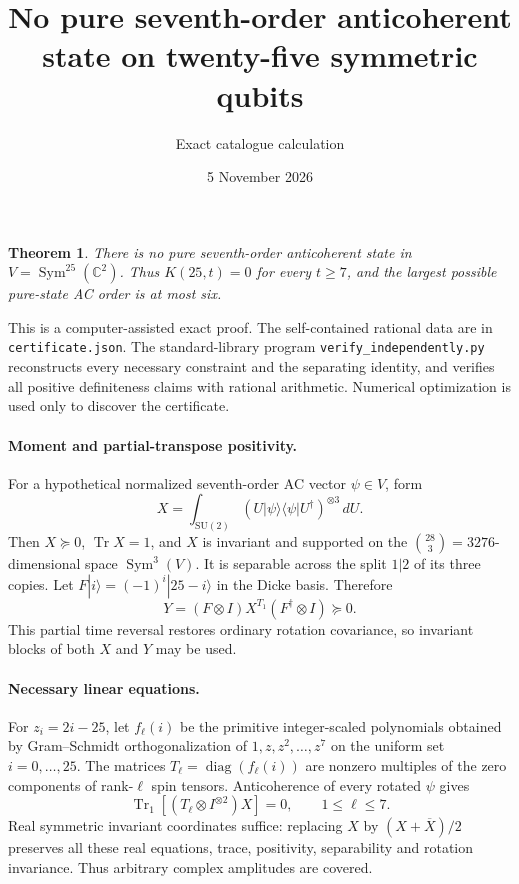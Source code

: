 \documentclass[11pt]{article}
\newtheorem{theorem}{Theorem}
\newcommand{\Tr}{\operatorname{Tr}}
\begin{document}
\title{No pure seventh-order anticoherent state on twenty-five symmetric qubits}
\author{Exact catalogue calculation}
\date{5 November 2026}
\maketitle
\begin{theorem}
There is no pure seventh-order anticoherent state in $V=\operatorname{Sym}^{25}(\mathbb C^2)$. Thus $K(25,t)=0$ for every $t\ge7$, and the largest possible pure-state AC order is at most six.
\end{theorem}
This is a computer-assisted exact proof. The self-contained rational data are in \texttt{certificate.json}. The standard-library program \texttt{verify\_independently.py} reconstructs every necessary constraint and the separating identity, and verifies all positive definiteness claims with rational arithmetic. Numerical optimization is used only to discover the certificate.

\paragraph{Moment and partial-transpose positivity.}
For a hypothetical normalized seventh-order AC vector $\psi\in V$, form
\[
X=\int_{\mathrm{SU}(2)}(U|\psi\rangle\langle\psi|U^\dagger)^{\otimes3}\,dU.
\]
Then $X\succeq0$, $\Tr X=1$, and $X$ is invariant and supported on the $\binom{28}{3}=3276$-dimensional space $\operatorname{Sym}^{3}(V)$. It is separable across the split $1|2$ of its three copies. Let $F|i\rangle=(-1)^i|25-i\rangle$ in the Dicke basis. Therefore
\[
Y=(F\otimes I)X^{T_1}(F^\dagger\otimes I)\succeq0.
\]
This partial time reversal restores ordinary rotation covariance, so invariant blocks of both $X$ and $Y$ may be used.

\paragraph{Necessary linear equations.}
For $z_i=2i-25$, let $f_\ell(i)$ be the primitive integer-scaled polynomials obtained by Gram--Schmidt orthogonalization of $1,z,z^2,\ldots,z^7$ on the uniform set $i=0,\ldots,25$. The matrices $T_\ell=\operatorname{diag}(f_\ell(i))$ are nonzero multiples of the zero components of rank-$\ell$ spin tensors. Anticoherence of every rotated $\psi$ gives
\[
\Tr_1[(T_\ell\otimes I^{\otimes2})X]=0,\qquad1\le\ell\le7.
\]
Real symmetric invariant coordinates suffice: replacing $X$ by $(X+\overline X)/2$ preserves all these real equations, trace, positivity, separability and rotation invariance. Thus arbitrary complex amplitudes are covered.
\end{document}
